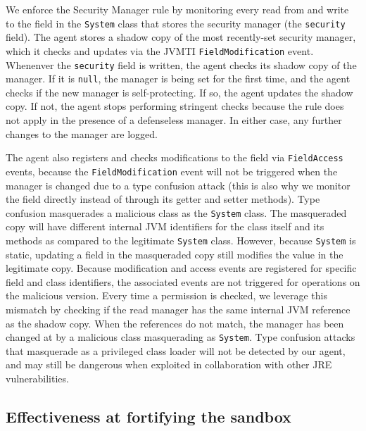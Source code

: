 \documentclass{sig-alternate}
\begin{document}
We enforce the Security Manager rule by monitoring every read from
and write to the field in the \texttt{System} class that stores the security
manager (the \texttt{security} field).
%
The agent stores a shadow copy of the most recently-set security
manager, which it checks and updates via the JVMTI \texttt{FieldModification} event.
Whenenver the \texttt{security} field is written, the agent checks its
shadow copy of the manager.  If it is \texttt{null},
the manager is being set for the first time, and the agent checks
if the new manager is self-protecting. If so, 
the agent updates the shadow copy. If not, the agent stops performing stringent
checks because the rule does not apply in the presence of a defenseless 
manager. In either case, any further changes to the manager are logged.

The agent also registers and checks modifications to the field via
\texttt{FieldAccess} events, 
because the \texttt{FieldModification} event will not be triggered
when the manager is changed due to a type confusion attack (this is also why we
monitor the field directly instead of through its getter and setter methods).  Type confusion 
masquerades a malicious class as the
\texttt{System} class.  The masqueraded copy will have different internal
JVM identifiers for the class itself and its methods as compared to the legitimate
\texttt{System} class. However, because \texttt{System} is static, updating a
field in the masqueraded copy still modifies the value in the legitimate copy. 
Because 
modification and access events are registered for specific field and
class identifiers, the associated events are not triggered for operations
on the malicious version. Every time a permission is checked, we leverage this mismatch
by checking if the read manager has the same internal
JVM reference as the shadow copy. When the references do not match,
the manager has been changed at by a malicious class masquerading as
\texttt{System}. Type confusion attacks that masquerade as a privileged class loader will not be detected by our agent, and may still be dangerous when exploited in collaboration with other JRE vulnerabilities.

\subsection{Effectiveness at fortifying the sandbox}
\label{sub:Effectiveness-at-Fortifying}

\end{document}
